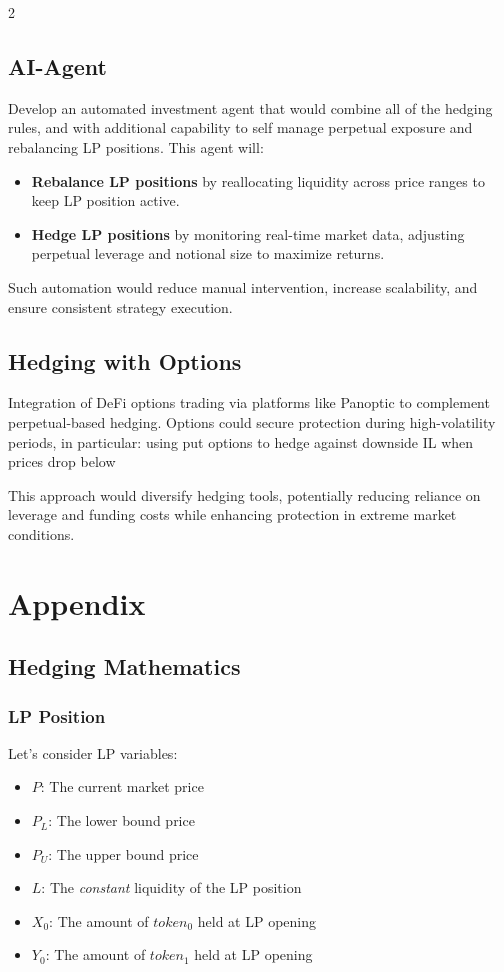 \documentclass[10pt]{article}
\begin{document}
\begin{multicols}{2}
\subsection{AI-Agent}
Develop an automated investment agent that would combine all of the hedging rules, and with additional capability to self manage perpetual exposure and rebalancing LP positions. This agent will:
\begin{itemize}
	\item \textbf{Rebalance LP positions} by reallocating liquidity across price ranges to keep LP position active.
	\item \textbf{Hedge LP positions} by monitoring real-time market data, adjusting perpetual leverage and notional size to maximize returns.
\end{itemize}
Such automation would reduce manual intervention, increase scalability, and ensure consistent strategy execution. 

\subsection{Hedging with Options}
Integration of DeFi options trading via platforms like Panoptic to complement perpetual-based hedging. Options could secure protection during high-volatility periods, in particular: using put options to hedge against downside IL when prices drop below 

\medskip

This approach would diversify hedging tools, potentially reducing reliance on leverage and funding costs while enhancing protection in extreme market conditions.

\newpage

\section{Appendix}

\bigskip

\subsection{Hedging Mathematics}
\medskip
\subsubsection{LP Position}
Let's consider LP variables:

\begin{itemize}
	\item $P$: The current market price
	\item $P_L$: The lower bound price
	\item $P_U$: The upper bound price
	\item $L$: The \emph{constant} liquidity of the LP position
	\item $X_0$: The amount of $token_0$ held at LP opening
	\item $Y_0$: The amount of $token_1$ held at LP opening
\end{itemize}


\end{multicols}
\end{document}
